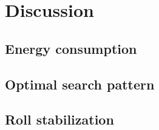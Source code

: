 \chapter{Discussion}


\section{Energy consumption}


\section{Optimal search pattern}



\section{Roll stabilization}



